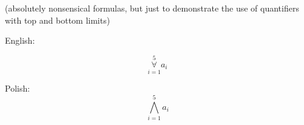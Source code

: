 \documentclass{article}
\begin{document}
(absolutely nonsensical formulas, but just to demonstrate
the use of quantifiers with top and bottom limits)

\bigskip\noindent
English:

\begin{equation}
\mathop \forall \limits_{i=1}^{5} a_i
\end{equation}

\bigskip\noindent
Polish:
\begin{equation}
\mathop \bigwedge \limits_{i=1}^{5} a_i
\end{equation}
\end{document}
